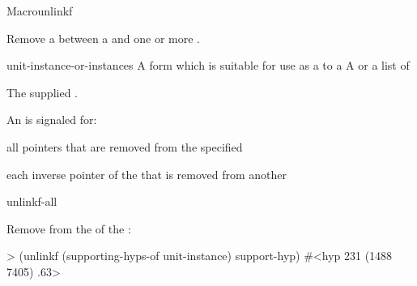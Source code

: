 \documentclass[10pt,twoside,english,pdftex]{article}
\begin{document}

\begin{functiondoc}{Macro}{unlinkf}%
  {
    \returns{} } 
%
%

\fnsyntax

\fnpurpose Remove a  between a  and one
or more .

\fnpackage {}

\fnmodule {}

\fnargs
\begin{args}{unit-instance-or-instances}
 A form which is suitable for use as a
 to a 
 A  or a
list of 
\end{args}

\fnreturns The supplied .

\fnevents
{}%
%
%
An  is signaled for:
\begin{tightitemize}
\item all pointers that are removed from the specified
\item each inverse pointer of the  that is removed from
  another 
\end{tightitemize}

\begin{alsos}{unlinkf-all}
\also[linkf]
\end{alsos}

\fnexample Remove  from the 
 of the  
:
\begin{example}
> (unlinkf (supporting-hyps-of unit-instance) support-hyp)
#<hyp 231 (1488 7405) .63>
\end{example}

\end{functiondoc}

\end{document}
